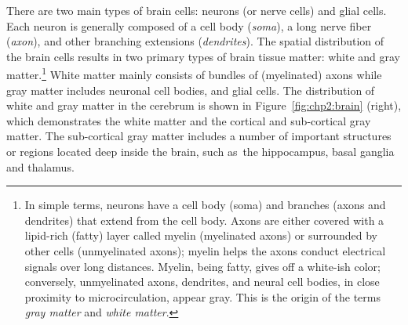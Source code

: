 There are two main types of brain cells: neurons (or nerve cells) and
glial cells. Each neuron is generally composed of a cell body
(\emph{soma}), a long nerve fiber (\emph{axon}), and other
branching extensions (\emph{dendrites}). The spatial distribution
of the brain cells results in two primary types of brain tissue
matter: white and gray matter.\footnote{In simple terms, neurons have
  a cell body (soma) and branches (axons and dendrites) that extend
  from the cell body. Axons are either covered with a lipid-rich
  (fatty) layer called myelin (myelinated axons) or 
  surrounded by other cells (unmyelinated axons); myelin helps the
  axons conduct electrical signals over long distances. Myelin, being
  fatty, gives off a white-ish color; conversely, unmyelinated axons,
  dendrites, and neural cell bodies, in close proximity to
  microcirculation, appear gray. This is the origin of the terms
  \textit{gray matter} and \textit{white matter}.} White matter mainly consists of
bundles of (myelinated) axons while gray matter includes neuronal cell
bodies, and glial cells. The distribution of white and gray matter in
the cerebrum is shown in Figure~\ref{fig:chp2:brain} (right), which
demonstrates the white matter and the cortical and sub-cortical gray
matter. The sub-cortical gray matter includes a number of important
structures or regions located deep inside the brain, such as~the
hippocampus, basal ganglia and thalamus.
